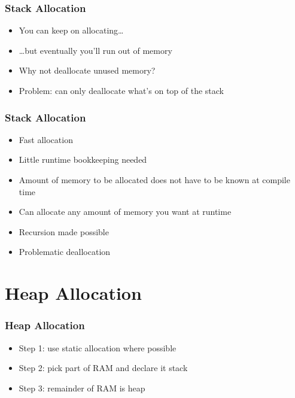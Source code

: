 \documentclass{../ucll-slides}
\newenvironment{procontralist}{
  \begingroup
  \newcommand{\pro}{\item[\Checkmark]}
  \newcommand{\con}{\item[\XSolidBrush]}
  \begin{itemize}
  }{
  \end{itemize}
  \endgroup}
\begin{document}
\begin{frame}
  \frametitle{Stack Allocation}
  \begin{itemize}
    \item You can keep on allocating\dots
    \item \dots but eventually you'll run out of memory
    \item Why not deallocate unused memory?
    \item Problem: can only deallocate what's on top of the stack
  \end{itemize}
\end{frame}

\begin{frame}
  \frametitle{Stack Allocation}
  \begin{procontralist}
    \pro Fast allocation
    \pro Little runtime bookkeeping needed
    \pro Amount of memory to be allocated does not have to be known at compile time
    \pro Can allocate any amount of memory you want at runtime
    \pro Recursion made possible
    \con Problematic deallocation
  \end{procontralist}
\end{frame}

\section{Heap Allocation}

\begin{frame}
  \tableofcontents[currentsection]
\end{frame}

\begin{frame}
  \frametitle{Heap Allocation}
  \begin{itemize}
    \item Step 1: use static allocation where possible
    \item Step 2: pick part of RAM and declare it stack
    \item Step 3: remainder of RAM is heap
  \end{itemize}
  \vskip5mm
  \begin{center}
  \end{center}
\end{frame}
\end{document}
